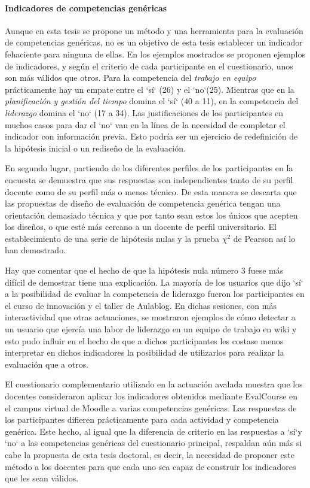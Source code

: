 \paragraph*{Indicadores de competencias genéricas}
Aunque en esta tesis se propone un método y una herramienta para la evaluación de competencias genéricas, no es un objetivo de esta tesis establecer un indicador fehaciente para ninguna de ellas. En los ejemplos mostrados se proponen ejemplos de indicadores, y según el criterio de cada participante en el cuestionario, unos son más válidos que otros. Para la competencia del \emph{trabajo en equipo} prácticamente hay un empate entre el `sí` (26) y el `no`(25). Mientras que en la \emph{planificación y gestión del tiempo} domina el `sí` (40 a 11), en la competencia del \emph{liderazgo} domina el `no` (17 a 34). Las justificaciones de los participantes en muchos casos para dar el `no` van en la línea de la necesidad de completar el indicador con información previa. Esto podría ser un ejercicio de redefinición de la hipótesis inicial o un rediseño de la evaluación.

En segundo lugar, partiendo de los diferentes perfiles de los participantes en la encuesta se demuestra que sus respuestas son independientes tanto de su perfil docente como de su perfil más o menos técnico. De esta manera se descarta que las propuestas de diseño de evaluación de competencia genérica tengan una orientación demasiado técnica y que por tanto sean estos los únicos que acepten los diseños, o que esté más cercano a un docente de perfil universitario. El establecimiento de una serie de hipótesis nulas y la prueba $\chi^2$ de Pearson así lo han demostrado.

Hay que comentar que el hecho de que la hipótesis nula número 3 fuese más difícil de demostrar tiene una explicación. La mayoría de los usuarios que dijo `sí` a la posibilidad de evaluar la competencia de liderazgo fueron los participantes en el curso de innovación y el taller de Aulablog. En dichas sesiones, con más interactividad que otras actuaciones, se mostraron ejemplos de cómo detectar a un usuario que ejercía una labor de liderazgo en un equipo de trabajo en wiki y esto pudo influir en el hecho de que a dichos participantes les costase menos interpretar en dichos indicadores la posibilidad de utilizarlos para realizar la evaluación que a otros. %

El cuestionario complementario utilizado en la actuación avalada muestra que los docentes consideraron aplicar los indicadores obtenidos mediante EvalCourse en el campus virtual de Moodle a varias competencias genéricas. Las respuestas de los participantes difieren prácticamente para cada actividad y competencia genérica. Este hecho, al igual que la diferencia de criterio en las respuestas a `sí`y `no` a las competencias genéricas del cuestionario principal, respaldan aún más si cabe la propuesta de esta tesis doctoral, es decir, la necesidad de proponer este método a los docentes para que cada uno sea capaz de construir los indicadores que les sean válidos.

